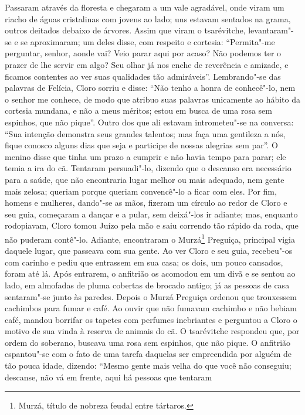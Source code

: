 Passaram através da floresta e chegaram a um vale agradável, onde viram
um riacho de águas cristalinas com jovens ao lado; uns estavam sentados
na grama, outros deitados debaixo de árvores. Assim que viram o
tsarévitche, levantaram"-se e se aproximaram; um deles disse, com
respeito e cortesia: ``Permita"-me perguntar, senhor, aonde vai? Veio
parar aqui por acaso? Não podemos ter o prazer de lhe servir em algo?
Seu olhar já nos enche de reverência e amizade, e ficamos contentes ao
ver suas qualidades tão admiráveis''. Lembrando"-se das palavras de
Felícia, Cloro sorriu e disse: ``Não tenho a honra de conhecê"-lo, nem o
senhor me conhece, de modo que atribuo suas palavras unicamente ao
hábito da cortesia mundana, e não a meus méritos; estou em busca de uma
rosa sem espinhos, que não pique''. Outro dos que ali estavam
intrometeu"-se na conversa: ``Sua intenção demonstra seus grandes
talentos; mas faça uma gentileza a nós, fique conosco alguns dias que
seja e participe de nossas alegrias sem par''. O menino disse que tinha
um prazo a cumprir e não havia tempo para parar; ele temia a ira do cã.
Tentaram persuadi"-lo, dizendo que o descanso era necessário para a
saúde, que não encontraria lugar melhor ou mais adequado, nem gente mais
zelosa; queriam porque queriam convencê"-lo a ficar com eles. Por fim,
homens e mulheres, dando"-se as mãos, fizeram um círculo ao redor de
Cloro e seu guia, começaram a dançar e a pular, sem deixá"-los ir
adiante; mas, enquanto rodopiavam, Cloro tomou Juízo pela mão e saiu
correndo tão rápido da roda, que não puderam contê"-lo. Adiante,
encontraram o Murzá\footnote{Murzá, título de nobreza feudal entre
  tártaros.} Preguiça, principal vigia daquele lugar, que passeava com
sua gente. Ao ver Cloro e seu guia, recebeu"-os com carinho e pediu que
entrassem em sua casa; os dois, um pouco cansados, foram até lá. Após
entrarem, o anfitrião os acomodou em um divã e se sentou ao lado, em
almofadas de pluma cobertas de brocado antigo; já as pessoas de casa
sentaram"-se junto às paredes. Depois o Murzá Preguiça ordenou que
trouxessem cachimbos para fumar e café. Ao ouvir que não fumavam
cachimbo e não bebiam café, mandou borrifar os tapetes com perfumes
inebriantes e perguntou a Cloro o motivo de sua vinda à reserva de
animais do cã. O tsarévitche respondeu que, por ordem do soberano,
buscava uma rosa sem espinhos, que não pique. O anfitrião espantou"-se
com o fato de uma tarefa daquelas ser empreendida por alguém de tão
pouca idade, dizendo: ``Mesmo gente mais velha do que você não
conseguiu; descanse, não vá em frente, aqui há pessoas que tentaram

